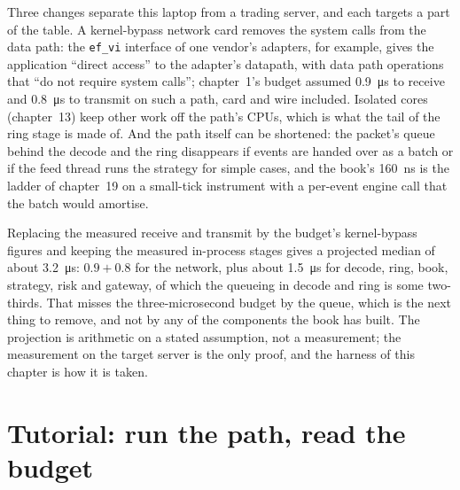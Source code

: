 Three changes separate this laptop from a trading server, and each targets a part of the table. A kernel-bypass network card
removes the system calls from the data path: the \texttt{ef\_vi} interface of one vendor's adapters, for example, gives the application
``direct access'' to the adapter's datapath, with data path operations that ``do not require system calls''; chapter~1's budget
assumed \qty{0.9}{\micro\second} to receive and \qty{0.8}{\micro\second} to transmit on such a path, card and wire included. Isolated
cores (chapter~13) keep other work off the path's CPUs, which is what the tail of the ring stage is made of. And the path itself
can be shortened: the packet's queue behind the decode and the ring disappears if events are handed over as a batch or if the
feed thread runs the strategy for simple cases, and the book's \qty{160}{\nano\second} is the ladder of chapter~19 on a
small-tick instrument with a per-event engine call that the batch would amortise.

Replacing the measured receive and transmit by the budget's kernel-bypass figures and keeping the measured in-process stages
gives a projected median of about \qty{3.2}{\micro\second}: $0.9 + 0.8$ for the network, plus about \qty{1.5}{\micro\second} for
decode, ring, book, strategy, risk and gateway, of which the queueing in decode and ring is some two-thirds. That misses the three-microsecond
budget by the queue, which is the next thing to remove, and not by any of the components the book has built. The projection is
arithmetic on a stated assumption, not a measurement; the measurement on the target server is the only proof, and the harness
of this chapter is how it is taken.

\section{Tutorial: run the path, read the budget}\label{tut:ll:build-tick-to-trade-measured:tut}


